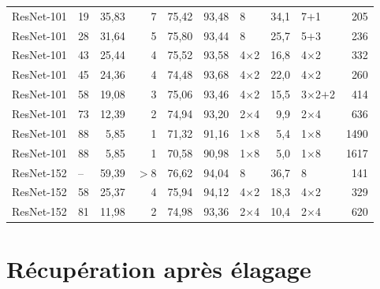 {\begin{longtable}{@{}llrrrrlrlr@{}}
ResNet-101 & 19 & 35,83 & 7 & 75,42 & 93,48 & 8 & 34,1 & 7$+$1 & 205 \\
ResNet-101 & 28 & 31,64 & 5 & 75,80 & 93,44 & 8 & 25,7 & 5$+$3 & 236 \\
ResNet-101 & 43 & 25,44 & 4 & 75,52 & 93,58 & 4$\times$2 & 16,8 & 4$\times$2 & 332 \\
ResNet-101 & 45 & 24,36 & 4 & 74,48 & 93,68 & 4$\times$2 & 22,0 & 4$\times$2 & 260 \\
ResNet-101 & 58 & 19,08 & 3 & 75,06 & 93,46 & 4$\times$2 & 15,5 & 3$\times$2$+$2 & 414 \\
ResNet-101 & 73 & 12,39 & 2 & 74,94 & 93,20 & 2$\times$4 & 9,9 & 2$\times$4 & 636 \\
ResNet-101 & 88 & 5,85 & 1 & 71,32 & 91,16 & 1$\times$8 & 5,4 & 1$\times$8 & 1490 \\
ResNet-101 & 88 & 5,85 & 1 & 70,58 & 90,98 & 1$\times$8 & 5,0 & 1$\times$8 & 1617 \\
\addlinespace[2pt]
ResNet-152 & -- & 59,39 & $>8$ & 76,62 & 94,04 & 8 & 36,7 & 8 & 141 \\
ResNet-152 & 58 & 25,37 & 4 & 75,94 & 94,12 & 4$\times$2 & 18,3 & 4$\times$2 & 329 \\
ResNet-152 & 81 & 11,98 & 2 & 74,98 & 93,36 & 2$\times$4 & 10,4 & 2$\times$4 & 620 \\
\end{longtable}
}

\clearpage
\section{Récupération après élagage}

